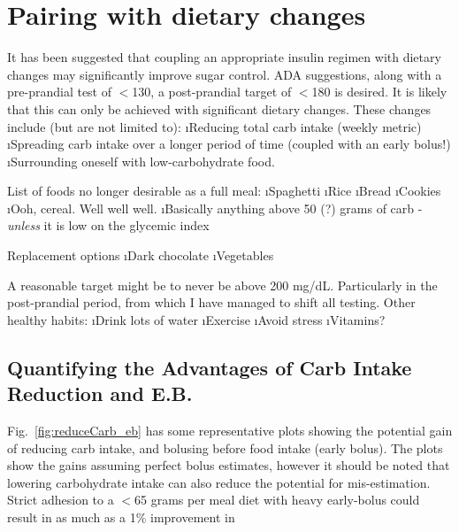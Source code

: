 \section{Pairing with dietary changes}
It has been suggested that coupling an appropriate insulin regimen with dietary changes may 
significantly improve sugar control. ADA suggestions, along with a pre-prandial test of $<$130, 
a post-prandial target of $<$180 is desired. It is likely that this can only be achieved with 
significant dietary changes. These changes include (but are not limited to):
\bi
	\i Reducing total carb intake (weekly metric)
	\i Spreading carb intake over a longer period of time (coupled with an early bolus!)
	\i Surrounding oneself with low-carbohydrate food.
\ei

List of foods no longer desirable as a full meal:
\bi
	\i Spaghetti
	\i Rice
	\i Bread
	\i Cookies
	\i Ooh, cereal. Well well well.
	\i Basically anything above 50 (?) grams of carb - {\it unless} it is low on the glycemic index
\ei

Replacement options
\bi
	\i Dark chocolate
	\i Vegetables
\ei

A reasonable target might be to never be above 200 mg/dL. Particularly in the post-prandial period, 
from which I have managed to shift all testing. Other healthy habits:
\bi
	\i Drink lots of water
	\i Exercise
	\i Avoid stress
	\i Vitamins?
\ei

\subsection{Quantifying the Advantages of Carb Intake Reduction and E.B.}

Fig.~\ref{fig:reduceCarb_eb} has some representative plots showing the potential gain of reducing 
carb intake, and bolusing before food intake (early bolus). The plots show the gains assuming perfect 
bolus estimates, however it should be noted that lowering carbohydrate intake can also reduce the 
potential for mis-estimation. Strict adhesion to a $<$65 grams per meal diet with heavy early-bolus 
could result in as much as a 1\% improvement in \hbac

